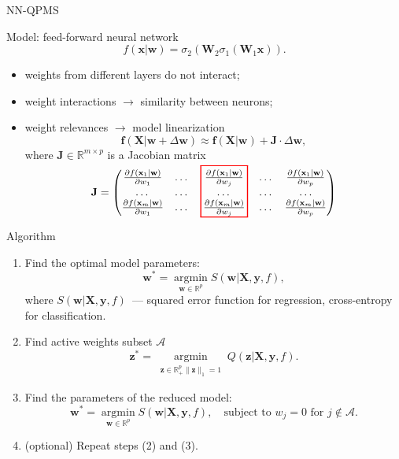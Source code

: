 \documentclass[9pt]{beamer}
\newcommand{\bx}{\mathbf{x}}
\newcommand{\by}{\mathbf{y}}
\newcommand{\bz}{\mathbf{z}}
\newcommand{\bw}{\mathbf{w}}
\newcommand{\bX}{\mathbf{X}}
\newcommand{\bW}{\mathbf{W}}
\newcommand{\bbR}{\mathbb{R}}
\newcommand{\argmin}{\mathop{\arg \min}\limits}
\begin{document}
\begin{frame}{NN-QPMS}
	\begin{block}{Model: feed-forward neural network}
		\[
			f(\bx | \bw) = \sigma_2\left(\bW_2 \sigma_1(\bW_1 \bx)\right).
		\]
	\end{block}
	\begin{itemize}
		\item weights from different layers do not interact;
		\item weight interactions $\rightarrow$ similarity between neurons;
		\item weight relevances $\rightarrow$ model linearization
		\begin{equation*}
			\mathbf{f} (\bX | \bw + \Delta \bw) \approx \mathbf{f}(\bX | \bw) + \mathbf{J} \cdot \Delta \bw,
		\end{equation*}
		where $\mathbf{J} \in \bbR^{m \times p}$ is a Jacobian matrix
		\begin{equation*}
			\mathbf{J} = 
			\begin{pmatrix}
			\frac{\partial f(\bx_1 | \bw)}{\partial w_1} & \dots & \smash{\setlength\fboxrule{1pt}\color{red}\fbox{\color{black}\rule[-30pt]{0pt}{1pt}$\frac{\partial f(\bx_1 | \bw)}{\partial w_j}$}} & \dots & \frac{\partial f(\bx_1 | \bw)}{\partial w_p} 
			 \\
			\dots & \dots & \dots & \dots & \dots\\
			\frac{\partial f(\bx_m | \bw)}{\partial w_1} & \dots & 
			\frac{\partial f(\bx_m | \bw)}{\partial w_j}  & \dots & \frac{\partial f(\bx_m | \bw)}{\partial w_p}
			\end{pmatrix}
		\end{equation*}
	\end{itemize}
\end{frame}
\begin{frame}{Algorithm}
	\begin{enumerate}
		\item Find the optimal model parameters:
		\begin{equation*}
			\bw^* = \argmin_{\bw \in \bbR^p} S(\bw | \bX, \by, f),
		\end{equation*}
		where $S(\bw | \bX, \by, f)$~--- squared error function for regression, cross-entropy for classification.
		\item Find active weights subset $\mathcal{A}$
		\[
			\bz^* = \argmin_{\substack{\bz \in \bbR^{p}_{+} \| \bz \|_1 = 1}} Q(\bz | \bX, \by, f).
		\]
		\item Find the parameters of the reduced model:
		\[
			\bw^* = \argmin_{\bw \in \bbR^p} S(\bw | \bX, \by, f), \quad \text{subject to } w_j = 0 \text{ for } j \notin \mathcal{A}.
		\]
		\item (optional) Repeat steps (2) and (3).
	\end{enumerate}
\end{frame}
\end{document}
